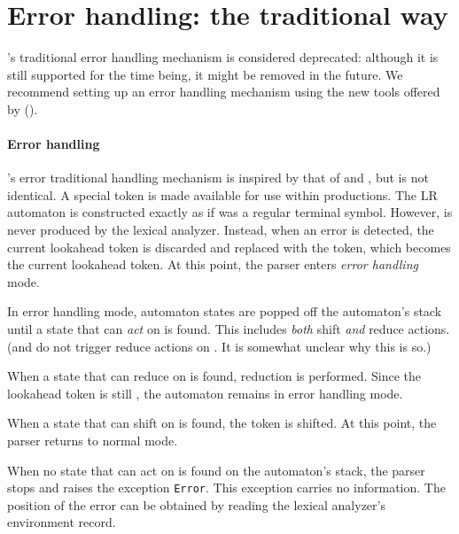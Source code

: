 \documentclass[onecolumn,11pt,nocopyrightspace,preprint]{sigplanconf}
\begin{document}


\section{Error handling: the traditional way}
\label{sec:errors}

\menhir's traditional error handling mechanism is considered deprecated: although
it is still supported for the time being, it might be removed in the future.
We recommend setting up an error handling mechanism using the new tools
offered by \menhir ().

\paragraph{Error handling}

\menhir's error traditional handling mechanism is inspired by that of \yacc and
\ocamlyacc, but is not identical. A special \error token is made available
for use within productions. The LR automaton is constructed exactly as if
\error was a regular terminal symbol. However, \error is never produced
by the lexical analyzer. Instead, when an error is detected, the current
lookahead token is discarded and replaced with the \error token, which becomes
the current lookahead token. At this point, the parser enters \emph{error
handling} mode.

In error handling mode, automaton states are popped off the automaton's stack
until a state that can \emph{act} on \error is found. This includes
\emph{both} shift \emph{and} reduce actions. (\yacc and \ocamlyacc do not
trigger reduce actions on \error. It is somewhat unclear why this is so.)

When a state that can reduce on \error is found, reduction is performed.
Since the lookahead token is still \error, the automaton remains in error
handling mode.

When a state that can shift on \error is found, the \error token is shifted.
At this point, the parser returns to normal mode.

When no state that can act on \error is found on the automaton's stack, the
parser stops and raises the exception \texttt{Error}. This exception carries
no information. The position of the error can be obtained by reading the
lexical analyzer's environment record.
\end{document}
